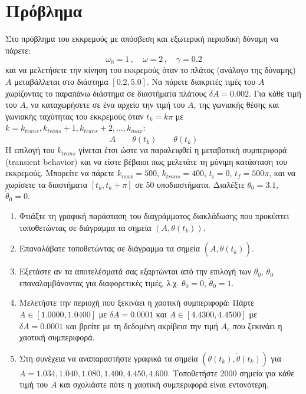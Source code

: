 \documentclass[a4paper,titlepage,12pt]{article}
\begin{document}
\section{Πρόβλημα}

Στο πρόβλημα του εκκρεμούς με απόσβεση και εξωτερική περιοδική δύναμη
να πάρετε:
$$
\omega_0 = 1\, , \quad
\omega   = 2\, , \quad
\gamma   = 0.2
$$ 
και να μελετήσετε την κίνηση του εκκρεμούς όταν το πλάτος (ανάλογο
της δύναμης) $A$ μεταβάλλεται στο διάστημα $[0.2,5.0]$. Να πάρετε
διακριτές τιμές του $A$ χωρίζοντας το παραπάνω διάστημα σε διαστήματα πλάτους
$\delta A=0.002$. Για κάθε τιμή του $A$, να καταχωρήσετε σε ένα αρχείο
την τιμή του $A$, της γωνιακής θέσης και γωνιακής ταχύτητας του εκκρεμούς όταν
$t_k=k \pi$ με $k=k_{trans},k_{trans}+ 1, k_{trans}+2, \ldots, k_{max}$:
$$
A\qquad  \theta(t_k)\qquad  \dot\theta(t_k)
$$
Η επιλογή του $k_{trans}$ γίνεται έτσι ώστε να παραλειφθεί η
μεταβατική συμπεριφορά (transient behavior) και να είστε βέβαιοι πως
μελετάτε τη μόνιμη κατάσταση του εκκρεμούς.
Μπορείτε να πάρετε $k_{max}=500$, $k_{trans}=400$, $t_i=0$,
$t_f=500\pi$, και να
χωρίσετε τα διαστήματα $[t_k,t_k+\pi]$ σε 50 υποδιαστήματα.
Διαλέξτε $\theta_0=3.1$, $\dot\theta_0=0$.

\begin{enumerate}
 \item Φτιάξτε τη γραφική παράσταση του διαγράμματος διακλάδωσης που
   προκύπτει τοποθετώντας σε διάγραμμα τα σημεία $(A,\theta(t_k))$.
 \item Επαναλάβατε τοποθετώντας σε διάγραμμα τα σημεία
   $(A,\dot\theta(t_k))$.
 \item Εξετάστε αν τα αποτελέσματά σας εξαρτώνται από την επιλογή των
   $\theta_0$, $\dot\theta_0$ επαναλαμβάνοντας για διαφορετικές τιμές,
   λ.χ.  $\theta_0=0$, $\dot\theta_0=1$.
 \item Μελετήστε την περιοχή που ξεκινάει η χαοτική συμπεριφορά: Πάρτε
   $A\in [1.0000,1.0400]$ με $\delta A=0.0001$ και $A\in
   [4.4300,4.4500]$ με $\delta A=0.0001$ και βρείτε με τη δεδομένη
   ακρίβεια την τιμή $A_c$ που ξεκινάει η χαοτική συμπεριφορά.
 \item Στη συνέχεια να αναπαραστήστε γραφικά τα σημεία
   $(\theta(t_k),\dot\theta(t_k))$ για $A =  1.034, 1.040, 1.080,
   1.400, 4.450, 4.600$. Τοποθετήστε 2000 σημεία για κάθε τιμή του $A$
   και σχολιάστε πότε η χαοτική συμπεριφορά είναι εντονότερη.
\end{enumerate}
 
\end{document}
